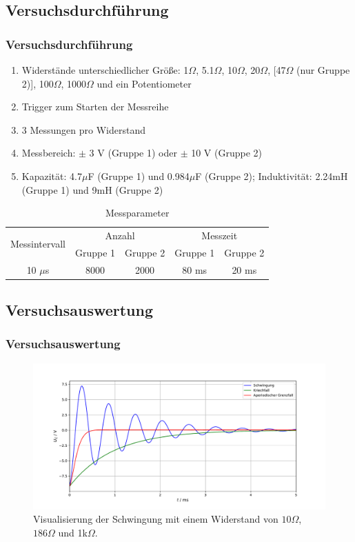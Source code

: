 \documentclass{beamer}
\begin{document}
\subsection{Versuchsdurchführung}

\begin{frame}
\frametitle{Versuchsdurchführung}

\begin{enumerate}[-]
\item Widerstände unterschiedlicher Größe: 1$\Omega$, 5.1$\Omega$, 10$\Omega$, 20$\Omega$, [47$\Omega$ (nur Gruppe 2)], 100$\Omega$, 1000$\Omega$ und ein Potentiometer
\item Trigger zum Starten der Messreihe
\item 3 Messungen pro Widerstand
\item Messbereich: $\pm$ 3 V (Gruppe 1) oder $\pm$ 10 V (Gruppe 2)
\item Kapazität: 4.7$\mu$F (Gruppe 1) und 0.984$\mu$F (Gruppe 2); Induktivität: 2.24mH (Gruppe 1) und 9mH (Gruppe 2)
\end{enumerate}

\begin{table}
\begin{tabular}{|c|c|c|c|c|}
\hline
\multirow{2}{*}{Messintervall} & \multicolumn{2}{c|}{Anzahl} & \multicolumn{2}{c|}{Messzeit} \\
\cline{2-5}
& Gruppe 1 & Gruppe 2 & Gruppe 1 & Gruppe 2 \\
\hline
10 $\mu$s & 8000 & 2000 & 80 ms & 20 ms \\
\hline
\end{tabular}
\caption{Messparameter}
\end{table}
\end{frame}

\subsection{Versuchsauswertung}

\begin{frame}
\frametitle{Versuchsauswertung}
\begin{figure}
\includegraphics[width=.9\linewidth]{abbildungen/rohdaten.pdf}
\caption{Visualisierung der Schwingung mit einem Widerstand von $10\Omega$, $186\Omega$ und 1k$\Omega$.}
\end{figure}
\end{frame}
\end{document}
